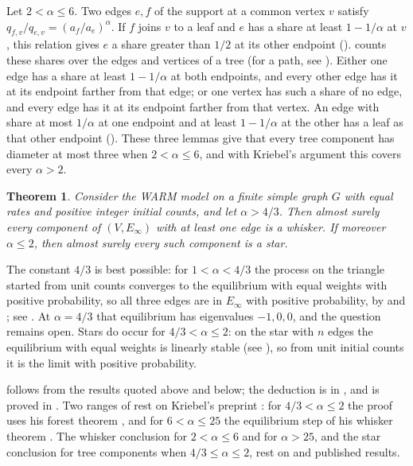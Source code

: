 \documentclass[11pt]{article}
\newtheorem{theorem}{Theorem}[section]
\theoremstyle{definition}
\theoremstyle{remark}
\begin{document}
Let $2<\alpha\le 6$. Two edges $e,f$ of the support at a
common vertex $v$ satisfy $q_{f,v}/q_{e,v}=(a_f/a_e)^\alpha$. If $f$ joins $v$ to a leaf and $e$ has
a share at least $1-1/\alpha$ at $v$, this relation gives $e$ a share greater than $1/2$ at its other endpoint
().  counts these shares over the edges and vertices of a tree (for a path, see
\cite[Corollary~3]{HHK}). Either one edge has a share at least $1-1/\alpha$ at both endpoints, and every other edge
has it at its endpoint farther from that edge; or one vertex has such a share of no edge, and every edge has it at
its endpoint farther from that vertex. An edge with share at most $1/\alpha$ at one endpoint and at least
$1-1/\alpha$ at the other has a leaf as that other endpoint (). These three lemmas give that every
tree component has diameter at most three when $2<\alpha\le 6$, and with Kriebel's argument this covers every
$\alpha>2$.

\begin{theorem}\label{thm:main}
Consider the WARM model on a finite simple graph $G$ with equal rates and positive integer initial
counts, and let $\alpha>4/3$. Then almost surely every component of $(V,E_\infty)$ with at least one edge is a whisker. If moreover
$\alpha\le 2$, then almost surely every such component is a star.
\end{theorem}

The constant $4/3$ is best possible: for $1<\alpha<4/3$ the process on the triangle started from unit counts
converges to the equilibrium with equal weights with positive probability, so all three edges are in $E_\infty$
with positive probability, by \cite[Theorem~3.8]{vdHHKR} and \cite[Theorem~1]{HHK}; see \cite[Theorem~1]{Kr}. At $\alpha=4/3$ that
equilibrium has eigenvalues $-1,0,0$, and the question remains open. Stars do occur for $4/3<\alpha\le 2$: on the
star with $n$ edges the equilibrium with equal weights is linearly stable \cite[Theorem~3.3]{vdHHKR} (see ), so from unit initial counts
it is the limit with positive probability.

 follows from the results quoted above and  below; the deduction is in
, and  is proved in . Two ranges of  rest on
Kriebel's preprint \cite{Kr}: for $4/3<\alpha\le2$ the proof uses his forest theorem \cite[Theorem~3]{Kr}, and for
$6<\alpha\le25$ the equilibrium step of his whisker theorem \cite[Section~4]{Kr}. The whisker conclusion for $2<\alpha\le6$ and for
$\alpha>25$, and the star conclusion for tree components when $4/3\le\alpha\le2$, rest on  and published
results.
\end{document}
